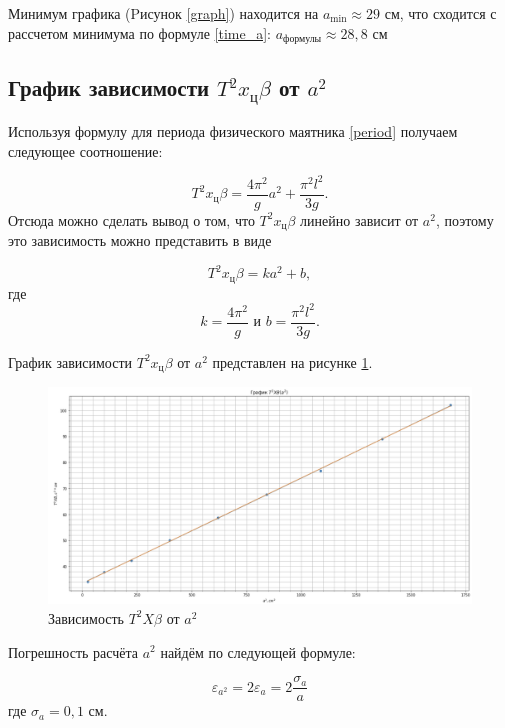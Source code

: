 \documentclass[a4paper,12pt]{article}
\begin{document}
 	
 	Минимум графика (Pисунок \ref{graph}) находится на $a_\text{min} \approx 29$ см, что сходится с рассчетом минимума по формуле \eqref{time_a}: $a_\text{формулы}\approx 28,8$ см
 	\subsection{График зависимости $ T^2 x_\text{ц}\beta $ от $ a^2 $ }
 	Используя формулу для периода физического маятника \eqref{period} получаем следующее соотношение:
 	
 	\begin{equation}
 		T^2x_\text{ц}\beta=\frac{4\pi^2}{g}a^2+\frac{\pi^2l^2}{3g}.
 	\end{equation}
 	Отсюда можно сделать вывод о том, что $ T^2x_\text{ц}\beta $ линейно зависит от $ a^2 $, поэтому это зависимость можно представить в виде
 	
 	\begin{equation}
 		T^2x_\text{ц}\beta=ka^2+b,
 	\end{equation}
 	где
 	\begin{equation}\label{koef}
 		k=\frac{4\pi^2}{g}  \text{ и }  b = \frac{\pi^2l^2}{3g}.
 	\end{equation}
 	
 	
 	График зависимости $ T^2x_\text{ц}\beta $ от $ a^2 $ представлен на рисунке \ref*{graph_file}.
 	
 	\begin{figure}[h!]
 		\includegraphics[scale=0.53]{graph_file}
 		\caption{Зависимость $ T^2X\beta $ от $ a^2 $}
 		\label{graph_file}
 	\end{figure}
 	\par
 	Погрешность расчёта $ a^2 $ найдём по следующей формуле:
 	
 	\begin{equation}
 		\varepsilon_{a^2}=2\varepsilon_a=2\frac{\sigma_a}{a}
 	\end{equation}
 	где $ \sigma_a = 0,1$ см.
 	
\end{document}
